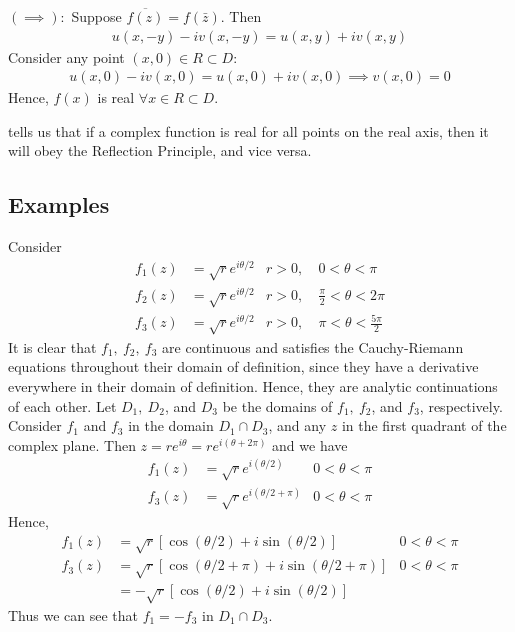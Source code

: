 \documentclass[12pt, english]{book}
\makeatletter
\renewenvironment{proof}[1][\proofname]{\par
	\pushQED{\qed}%
	\normalfont \topsep6\p@\@plus6\p@\relax
	\list{}{%
		\settowidth{\leftmargin}{\itshape\proofname:\hskip\labelsep}%
		\setlength{\labelwidth}{0pt}%
		\setlength{\itemindent}{-\leftmargin}%
		}%
	\item[\hskip\labelsep\itshape#1\@addpunct{:}]\ignorespaces
	}{\popQED\endlist\@endpefalse}
\makeatother
\begin{document}
\begin{proof}
		
		\underline{\((\implies):\)} \newline
		Suppose \(\overline{f(z)} = f(\bar{z})\). Then 
		\begin{align*}
			u(x, -y) - iv(x, -y) = u(x,y) + iv(x,y)
		\end{align*}
		Consider any point \((x, 0) \in R \subset D\):
		\begin{align*}
			u(x,0) - iv(x, 0) = u(x, 0) + iv(x, 0) \implies v(x, 0) = 0
		\end{align*}
		Hence, \(f(x)\) is real \(\forall x \in R \subset D\).
	\end{proof}

	 tells us that if a complex function is real for all points on the real axis, then it will obey the Reflection Principle, and vice versa.
	
	\subsection{Examples} 
	\begin{example}
		\label{f_1 neq f_3 in analytic continuation Example - Complex}
		Consider 
		\begin{align*}
			f_1(z) &= \sqrt{r} e^{i\theta / 2} & r>0,&\ 0<\theta<\pi \\
			f_2(z) &= \sqrt{r} e^{i\theta / 2} & r>0,&\ \frac{\pi}{2}<\theta<2\pi \\
			f_3(z) &= \sqrt{r} e^{i\theta / 2} & r>0,&\ \pi<\theta<\frac{5\pi}{2} 
		\end{align*}
		{\color{Grey}
		It is clear that \(f_1, \ f_2, \ f_3\) are continuous and satisfies the Cauchy-Riemann equations throughout their domain of definition, since they have a derivative everywhere in their domain of definition. Hence, they are analytic continuations of each other. Let \(D_1, \ D_2\), and \(D_3\) be the domains of \(f_1, \ f_2\), and \(f_3\), respectively. Consider \(f_1\) and \(f_3\) in the domain \(D_1 \cap D_3\), and any \(z\) in the first quadrant of the complex plane. Then \(z = re^{i \theta} = re^{i(\theta + 2\pi)}\)
		and we have
		\begin{align*}
			f_1(z) &= \sqrt{r} e^{i(\theta/2)}  &  0<\theta<\pi \\
			f_3(z) &= \sqrt{r} e^{i(\theta/2 + \pi)}  & 0<\theta<\pi 
		\end{align*}
		Hence, 
		\begin{align*}
			f_1(z) &= \sqrt{r}[\cos(\theta/2) + i\sin(\theta/2)] &  0<\theta<\pi \\
			f_3(z) &= \sqrt{r}[\cos(\theta/2 + \pi) + i\sin(\theta/2+\pi)] & 0<\theta<\pi \\
				   &= - \sqrt{r}[\cos(\theta/2) + i\sin(\theta/2)] 
		\end{align*}
		Thus we can see that \(f_1 = -f_3\) in \(D_1 \cap D_3\).
		}
	\end{example}
\end{document}
